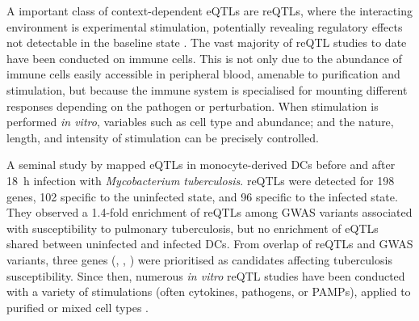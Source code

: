 \begin{outline}
A important class of context-dependent \glspl{eQTL} are \glspl{reQTL}, 
where the interacting environment is experimental stimulation,
potentially revealing regulatory effects not detectable in the baseline state \autocite{vandiedonck2017GeneticAssociationMolecular,huang2019GeneticsGeneExpression}.
The vast majority of \gls{reQTL} studies to date have been conducted on immune cells. 
This is not only due to the abundance of immune cells easily accessible in peripheral blood, amenable to purification and stimulation,
but because the immune system is specialised for mounting different responses depending on the pathogen or perturbation.
When stimulation is performed \textit{in vitro}, variables such as cell type and abundance; and the nature, length, and intensity of stimulation can be precisely controlled.

A seminal study by \textcite{barreiro2012DecipheringGeneticArchitecture} mapped \glspl{eQTL} in monocyte-derived \glspl{DC} before and after \SI{18}{\hour} infection with \textit{Mycobacterium tuberculosis}.
\glspl{reQTL} were detected for 198 genes, 102 specific to the uninfected state, and 96 specific to the infected state. 
They observed a 1.4-fold enrichment of \glspl{reQTL} among \gls{GWAS} variants associated with susceptibility to pulmonary tuberculosis,
but no enrichment of \glspl{eQTL} shared between uninfected and infected \glspl{DC}.
From overlap of \glspl{reQTL} and \gls{GWAS} variants,
three genes (, , ) were prioritised as candidates affecting tuberculosis susceptibility.
Since then, numerous \textit{in vitro} \gls{reQTL} studies have been conducted with a variety of stimulations (often cytokines, pathogens, or \glspl{PAMP}),
applied to purified \autocite{fairfax2014InnateImmuneActivity,kim2014CharacterizingGeneticBasis,hu2014RegulationGeneExpression,lee2014CommonGeneticVariants,caliskan2015HostGeneticVariation,quach2016GeneticAdaptationNeandertal,kim-hellmuth2017GeneticRegulatoryEffects,alasoo2018SharedGeneticEffects,gate2018GeneticDeterminantsCoaccessible,schmiedel2018ImpactGeneticPolymorphisms,alasoo2019GeneticEffectsPromoter,calderon2019LandscapeStimulationresponsiveChromatin,devries2020IntegratingGWASBulk,huang2020NeonatalGeneticsGene}
or mixed cell types \autocite{caliskan2015HostGeneticVariation,manry2017DecipheringGeneticControl}.


\end{outline}
